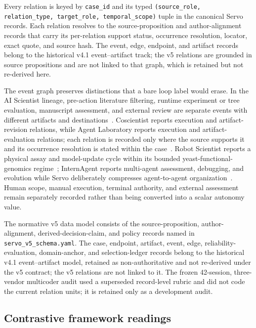 \documentclass{article}
\begin{document}
Every relation is keyed by \texttt{case\_id} and its typed
\texttt{(source\_role, relation\_type, target\_role, temporal\_scope)} tuple in the canonical
Servo records. Each relation resolves to the source-proposition and author-alignment records that carry its
per-relation support status, occurrence resolution, locator, exact quote, and source hash. The
event, edge, endpoint, and artifact records belong to the historical v4.1 event--artifact track;
the v5 relations are grounded in source propositions and are not linked to that graph, which is
retained but not re-derived here.

The event graph preserves distinctions that a bare loop label would erase. In the AI Scientist lineage, pre-action literature filtering, runtime experiment or tree evaluation, manuscript assessment, and external review are separate events with different artifacts and destinations~\citep{lu2024aiscientist,lu2026aiscientist}. Coscientist reports execution and artifact-revision relations, while Agent Laboratory reports execution and artifact-evaluation relations; each relation is recorded only where the source supports it and its occurrence resolution is stated within the case~\citep{boiko2023emergent,schmidgall2025agentlab}. Robot Scientist reports a physical assay and model-update cycle within its bounded yeast-functional-genomics regime~\citep{king2004robot,sparkes2010robot}; InternAgent reports multi-agent assessment, debugging, and evolution while Servo deliberately compresses agent-to-agent organization~\citep{zhang2025novelseek}. Human scope, manual execution, terminal authority, and external assessment remain separately recorded rather than being converted into a scalar autonomy value.

The normative v5 data model consists of the source-proposition, author-alignment, derived-decision-claim, and policy records named in \texttt{servo\_v5\_schema.yaml}. The case, endpoint, artifact, event, edge, reliability-evaluation, domain-anchor, and selection-ledger records belong to the historical v4.1 event--artifact model, retained as non-authoritative and not re-derived under the v5 contract; the v5 relations are not linked to it. The frozen 42-session, three-vendor multicoder audit used a superseded record-level rubric and did not code the current relation units; it is retained only as a development audit.

\subsection{Contrastive framework readings}
\end{document}
